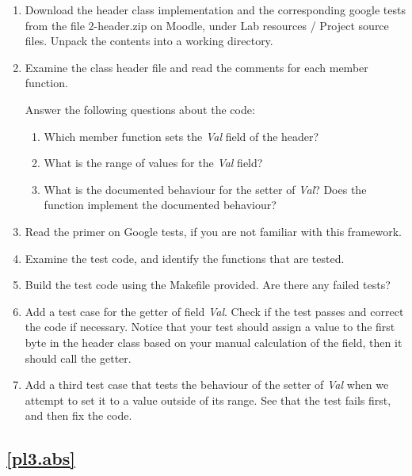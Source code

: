 \documentclass[12pt]{book}
\begin{document}
\begin{enumerate}[resume*]
\item Download the header class implementation and the corresponding google tests from the file 2-header.zip on Moodle, under Lab resources / Project source files. Unpack the contents into a working directory.

\item Examine the class header file and read the comments for each member function. 

Answer the following questions about the code:
\begin{enumerate}[label=(\alph*)]
\item Which member function sets the \emph{Val} field of the header?
\item What is the range of values for the \emph{Val} field?
\item What is the documented behaviour for the setter of \emph{Val}? Does the function implement the documented behaviour?
\end{enumerate}
  
\item Read the primer on Google tests, if you are not familiar with this framework.

\item Examine the test code, and identify the functions that are tested.

\item Build the test code using the Makefile provided. Are there any failed tests?

\item Add a test case for the getter of field \emph{Val}. Check if the test passes and correct the code if necessary. Notice that your test should assign a value to the first byte in the header class based on your manual calculation of the field, then it should call the getter.

\item Add a third test case that tests the behaviour of the setter of \emph{Val} when we attempt to set it to a value outside of its range. See that the test fails first, and then fix the code.
\end{enumerate}


\subsection{\ref{pl3.abs}}
\end{document}
